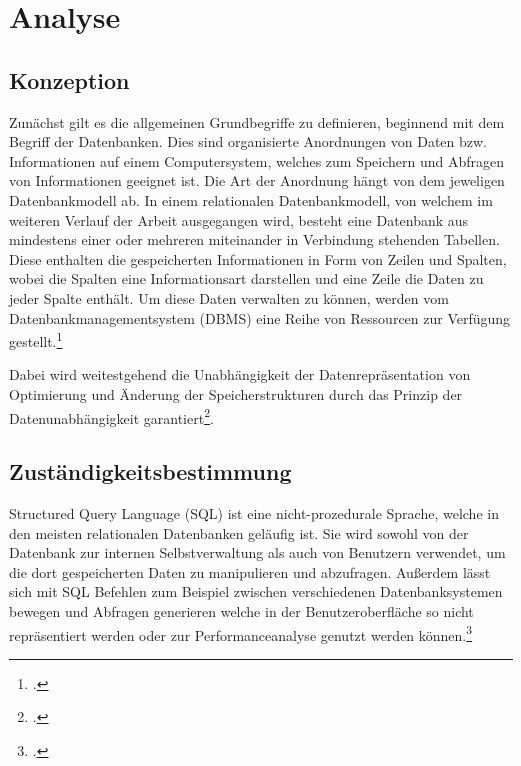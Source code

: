 \newpage
\section{Analyse}
\subsection{Konzeption}
Zunächst gilt es die allgemeinen Grundbegriffe zu definieren, beginnend mit dem Begriff der Datenbanken. Dies sind organisierte Anordnungen von Daten bzw. Informationen auf einem Computersystem, welches zum Speichern und Abfragen von Informationen geeignet ist. Die Art der Anordnung hängt von dem jeweligen Datenbankmodell ab. In einem relationalen Datenbankmodell, von welchem im weiteren Verlauf der Arbeit ausgegangen wird, besteht eine Datenbank aus mindestens einer oder mehreren miteinander in Verbindung stehenden Tabellen. Diese enthalten die gespeicherten Informationen in Form von Zeilen und Spalten, wobei die Spalten eine Informationsart darstellen und eine Zeile die Daten zu jeder Spalte enthält.
Um diese Daten verwalten zu können, werden vom Datenbankmanagementsystem (DBMS) eine Reihe von Ressourcen zur Verfügung gestellt.\footcite[Vgl.][]{samu2002database}

Dabei wird weitestgehend die Unabhängigkeit der Datenrepräsentation von Optimierung und Änderung der Speicherstrukturen durch das Prinzip der Datenunabhängigkeit garantiert\footcite[Vgl.][Seite 1]{saake2011datenbanken}.

\subsection{Zuständigkeitsbestimmung}
Structured Query Language (SQL) ist eine nicht-prozedurale Sprache, welche in den meisten relationalen Datenbanken geläufig ist. Sie wird sowohl von der Datenbank zur internen Selbstverwaltung als auch von Benutzern verwendet, um die dort gespeicherten Daten zu manipulieren und abzufragen. Außerdem lässt sich mit SQL Befehlen zum Beispiel zwischen verschiedenen Datenbanksystemen bewegen und Abfragen generieren welche in der Benutzeroberfläche so nicht repräsentiert werden oder zur Performanceanalyse genutzt werden können.\footcite[Vgl.][]{UniversityofDelaware}

